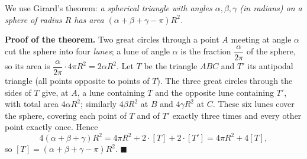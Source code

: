 We use Girard's theorem: \emph{a spherical triangle with angles $\alpha,\beta,\gamma$ (in radians) on a sphere of radius $R$ has area $\left(\alpha+\beta+\gamma-\pi\right)R^2$.}

\textbf{Proof of the theorem.} Two great circles through a point $A$ meeting at angle $\alpha$ cut the sphere into four \emph{lunes}; a lune of angle $\alpha$ is the fraction $\dfrac{\alpha}{2\pi}$ of the sphere, so its area is $\dfrac{\alpha}{2\pi}\cdot4\pi R^2=2\alpha R^2$. Let $T$ be the triangle $ABC$ and $T'$ its antipodal triangle (all points opposite to points of $T$). The three great circles through the sides of $T$ give, at $A$, a lune containing $T$ and the opposite lune containing $T'$, with total area $4\alpha R^2$; similarly $4\beta R^2$ at $B$ and $4\gamma R^2$ at $C$. These six lunes cover the sphere, covering each point of $T$ and of $T'$ exactly three times and every other point exactly once. Hence
\[
4(\alpha+\beta+\gamma)R^2=4\pi R^2+2\cdot[T]+2\cdot[T'] =4\pi R^2+4[T],
\]
so $[T]=(\alpha+\beta+\gamma-\pi)R^2$. $\blacksquare$

